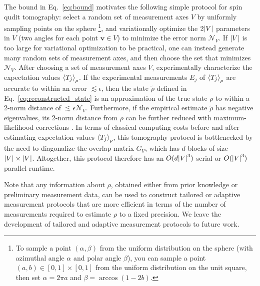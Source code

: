 \documentclass[notitlepage,twocolumn]{revtex4-2}
\newcommand{\p}[1]{\left(#1\right)} %
\newcommand{\bk}{\Braket} %
\renewcommand{\v}{\bm} %
\newcommand{\1}{\mathds{1}}
\newcommand{\N}{\mathcal{N}}
\begin{document}
The bound in Eq.~\eqref{eq:bound} motivates the following simple protocol for spin qudit tomography: select a random set of measurement axes $V$ by uniformly sampling points on the sphere \footnote{To sample a point $\p{\alpha,\beta}$ from the uniform distribution on the sphere (with azimuthal angle $\alpha$ and polar angle $\beta$), you can sample a point $\p{a,b}\in[0,1]\times[0,1]$ from the uniform distribution on the unit square, then set $\alpha=2\pi a$ and $\beta=\arccos\p{1-2b}$.}, and variationally optimize the $2\abs{V}$ parameters in $V$ (two angles for each point $\v v\in V$) to minimize the error norm $\N_V$.
If $\abs{V}$ is too large for variational optimization to be practical, one can instead generate many random sets of measurement axes, and then choose the set that minimizes $\N_V$.
After choosing a set of measurement axes $V$, experimentally characterize the expectation values $\bk{T_j}_\rho$.
If the experimental measurements $E_j$ of $\bk{T_j}_\rho$ are accurate to within an error $\lesssim\epsilon$, then the state $\tilde\rho$ defined in Eq.~\eqref{eq:reconstructed_state} is an approximation of the true state $\rho$ to within a 2-norm distance of $\lesssim\epsilon\N_V$.
Furthermore, if the empirical estimate $\tilde\rho$ has negative eigenvalues, its 2-norm distance from $\rho$ can be further reduced with maximum-likelihood corrections \cite{smolin2012efficient}.
In terms of classical computing costs before and after estimating expectation values $\bk{T_j}_\rho$, this tomography protocol is bottlenecked by the need to diagonalize the overlap matrix $G_V$, which has $d$ blocks of size $\abs{V}\times\abs{V}$.
Altogether, this protocol therefore has an $O(d\abs{V}^3)$ serial or $O(\abs{V}^3)$ parallel runtime.

Note that any information about $\rho$, obtained either from prior knowledge or preliminary measurement data, can be used to construct tailored or adaptive measurement protocols \cite{pereira2018adaptive} that are more efficient in terms of the number of measurements required to estimate $\rho$ to a fixed precision.
We leave the development of tailored and adaptive measurement protocols to future work.
\end{document}
